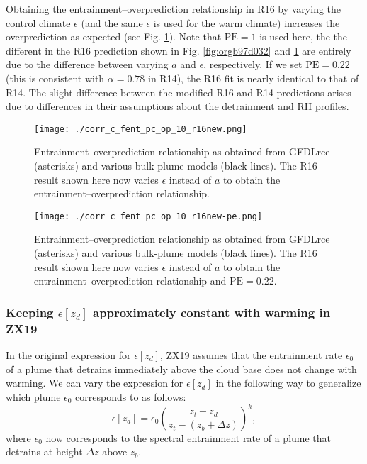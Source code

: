 \documentclass[11pt]{article}
\begin{document}
Obtaining the entrainment--overprediction relationship in R16 by varying the control climate \(\epsilon\) (and the same \(\epsilon\) is used for the warm climate) increases the overprediction as expected (see Fig. \ref{fig:org97fb8e3}). Note that \(\mathrm{PE}=1\) is used here, the the different in the R16 prediction shown in Fig. \ref{fig:orgb97d032} and \ref{fig:org97fb8e3} are entirely due to the difference between varying \(a\) and \(\epsilon\), respectively. If we set \(\mathrm{PE}=0.22\) (this is consistent with \(\alpha=0.78\) in R14), the R16 fit is nearly identical to that of R14. The slight difference between the modified R16 and R14 predictions arises due to differences in their assumptions about the detrainment and RH profiles.

\begin{figure}[htbp]
\centering
\texttt{[image: ./corr\_c\_fent\_pc\_op\_10\_r16new.png]}
\caption{\label{fig:org97fb8e3}Entrainment--overprediction relationship as obtained from GFDLrce (asterisks) and various bulk-plume models (black lines). The R16 result shown here now varies \(\epsilon\) instead of \(a\) to obtain the entrainment--overprediction relationship.}
\end{figure}

\begin{figure}[htbp]
\centering
\texttt{[image: ./corr\_c\_fent\_pc\_op\_10\_r16new-pe.png]}
\caption{\label{fig:orgb08e4b0}Entrainment--overprediction relationship as obtained from GFDLrce (asterisks) and various bulk-plume models (black lines). The R16 result shown here now varies \(\epsilon\) instead of \(a\) to obtain the entrainment--overprediction relationship and \(\mathrm{PE}=0.22\).}
\end{figure}

\subsubsection*{Keeping \(\epsilon[z_d]\) approximately constant with warming in ZX19}
\label{sec:orgb01e4b2}
In the original expression for \(\epsilon[z_d]\), ZX19 assumes that the entrainment rate \(\epsilon_0\) of a plume that detrains immediately above the cloud base does not change with warming. We can vary the expression for \(\epsilon[z_d]\) in the following way to generalize which plume \(\epsilon_0\) corresponds to as follows:
\begin{equation}
\epsilon[z_d] = \epsilon_0 \left(\frac{z_t - z_d}{z_t - (z_b + \Delta z)}\right)^k,
\end{equation}
where \(\epsilon_0\) now corresponds to the spectral entrainment rate of a plume that detrains at height \(\Delta z\) above \(z_b\).
\end{document}

